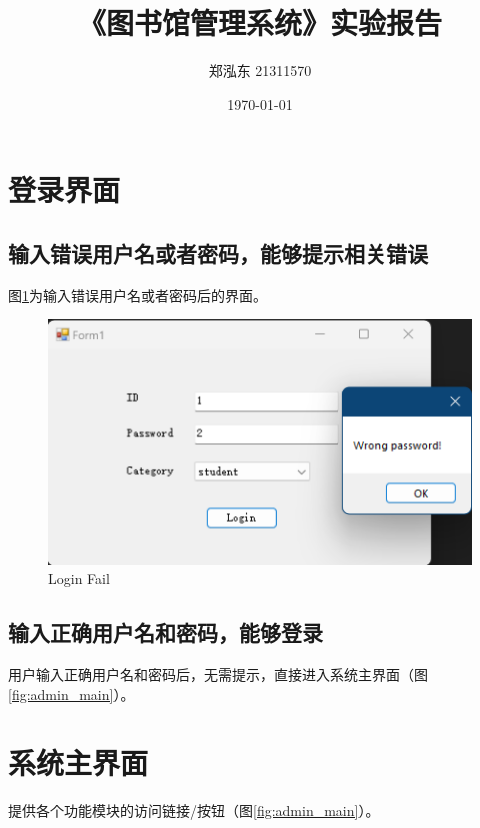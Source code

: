 \documentclass{article}
\begin{document}
\sloppy %

\title{《图书馆管理系统》实验报告}
\author{郑泓东 21311570}
\date{\today}

\maketitle

\section{登录界面}

\subsection{输入错误用户名或者密码，能够提示相关错误}
图\ref{fig:login_fail}为输入错误用户名或者密码后的界面。

\begin{figure}[H]
    \centering
    \includegraphics[width=1\textwidth]{../pic/login_fail.png}
    \caption{Login Fail}
    \label{fig:login_fail}
\end{figure}

\subsection{输入正确用户名和密码，能够登录}
用户输入正确用户名和密码后，无需提示，直接进入系统主界面（图\ref{fig:admin_main}）。

\section{系统主界面}
提供各个功能模块的访问链接/按钮（图\ref{fig:admin_main}）。
\end{document}

